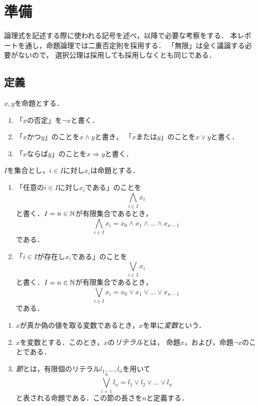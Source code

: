 
\section{準備}

論理式を記述する際に使われる記号を述べ，以降で必要な考察をする．
本レポートを通し，命題論理では二重否定則を採用する．
「無限」は全く議論する必要がないので，
選択公理は採用しても採用しなくとも同じである．

\subsection{定義}

\begin{nota}
 $x, y$を命題とする．
 \begin{enumerate}[1.]
  \item 「$x$の否定」を$\lnot x$と書く．
  \item 「$x$かつ$y$」のことを$x \land y$と書き，
        「$x$または$y$」のことを$x \lor y$と書く．
  \item 「$x$ならば$y$」のことを$x \Rightarrow y$と書く．
 \end{enumerate}
\end{nota}

\begin{nota}
 $I$を集合とし，$i \in I$に対し$x_i$は命題とする．
 \begin{enumerate}[1.]
  \item 「任意の$i \in I$に対し$x_i$である」のことを
        \[
         \bigwedge_{i \in I} x_i
        \]
        と書く．$I = n \in \mathbb{N}$が有限集合であるとき，
        \[
         \bigwedge_{i \in I} x_i = x_0 \land x_1 \land \dots \land x_{n-1}
        \]
        である．
  \item 「$i \in I$が存在し$x_i$である」のことを
        \[
         \bigvee_{i \in I} x_i
        \]
        と書く．$I = n \in \mathbb{N}$が有限集合であるとき，
        \[
         \bigvee_{i \in I} x_i = x_0 \lor x_1 \lor \dots \lor x_{n-1}
        \]
        である．
 \end{enumerate}
\end{nota}

\begin{defn}
 \begin{enumerate}[1.]
  \item $x$が真か偽の値を取る変数であるとき，$x$を単に\emph{変数}という．
  \item $x$を変数とする．このとき，$x$の\emph{リテラル}とは，
        命題$x$，および，命題$\lnot x$のことである．
  \item \emph{節}とは，有限個のリテラル$l_1, \dots, l_n$を用いて
        \[
         \bigvee_{i = 1}^n l_n = l_1 \lor l_2 \lor \dots \lor l_n
        \]
        と表される命題である．この節の長さを$n$と定義する．
 \end{enumerate}
\end{defn}

